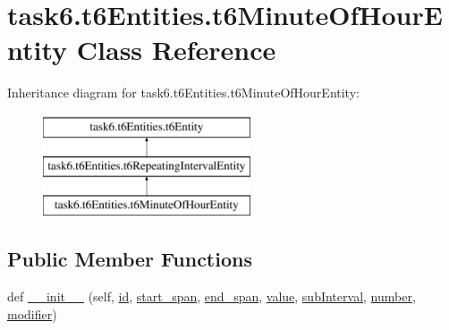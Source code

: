 \hypertarget{classtask6_1_1t6Entities_1_1t6MinuteOfHourEntity}{}\section{task6.\+t6\+Entities.\+t6\+Minute\+Of\+Hour\+Entity Class Reference}
\label{classtask6_1_1t6Entities_1_1t6MinuteOfHourEntity}
Inheritance diagram for task6.\+t6\+Entities.\+t6\+Minute\+Of\+Hour\+Entity\+:\begin{figure}[H]
\begin{center}
\leavevmode
\includegraphics[height=3.000000cm]{classtask6_1_1t6Entities_1_1t6MinuteOfHourEntity}
\end{center}
\end{figure}
\subsection*{Public Member Functions}
\begin{DoxyCompactItemize}
\item 
def \hyperlink{classtask6_1_1t6Entities_1_1t6MinuteOfHourEntity_ad5546058d02990428fa86ed2fce28813}{\+\_\+\+\_\+init\+\_\+\+\_\+} (self, \hyperlink{classtask6_1_1t6Entities_1_1t6Entity_a96b2e7fb553c920ab2db6f6deb31e3b4}{id}, \hyperlink{classtask6_1_1t6Entities_1_1t6Entity_a8221c36d2995a24200cdfbd74cc9233c}{start\+\_\+span}, \hyperlink{classtask6_1_1t6Entities_1_1t6Entity_a597d42bb02fc9f42277098f0ce21917c}{end\+\_\+span}, \hyperlink{classtask6_1_1t6Entities_1_1t6MinuteOfHourEntity_a05c8f877ba7e2a14268822f4b5d44b8e}{value}, \hyperlink{classtask6_1_1t6Entities_1_1t6MinuteOfHourEntity_aaec6fa90307d3ca499db6c3d1850c473}{sub\+Interval}, \hyperlink{classtask6_1_1t6Entities_1_1t6MinuteOfHourEntity_ade30fe04589a01f2e18da1402a747d23}{number}, \hyperlink{classtask6_1_1t6Entities_1_1t6MinuteOfHourEntity_a44258f98be3f8d67ee180b919a9bc7b9}{modifier})
\end{DoxyCompactItemize}
